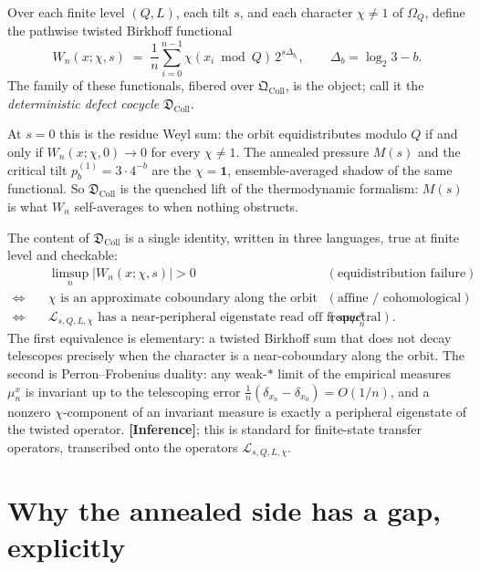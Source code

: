 \documentclass[11pt]{article}
\newcommand{\Lcal}{\mathcal{L}}
\newcommand{\Om}{\Omega}
\newcommand{\Qcoll}{\mathfrak{Q}_{\mathrm{Coll}}}
\newcommand{\Dcoll}{\mathfrak{D}_{\mathrm{Coll}}}
\newcommand{\epi}[1]{{\small\sffamily\textbf{[#1]}}}
\theoremstyle{remark}
\begin{document}
Over each finite level $(Q,L)$, each tilt $s$, and each character $\chi\ne 1$ of $\Om_Q$,
define the pathwise twisted Birkhoff functional
\[
W_n(x;\chi,s) \;=\; \frac1n \sum_{i=0}^{n-1} \chi(x_i \bmod Q)\, 2^{s\Delta_{b_i}},
\qquad \Delta_b = \log_2 3 - b.
\]
The family of these functionals, fibered over $\Qcoll$, is the object; call it the
\emph{deterministic defect cocycle} $\Dcoll$.

At $s=0$ this is the residue Weyl sum: the orbit equidistributes modulo $Q$ if and only if
$W_n(x;\chi,0)\to 0$ for every $\chi\ne 1$. The annealed pressure $M(s)$ and the critical
tilt $p^{(1)}_b = 3\cdot 4^{-b}$ are the $\chi=\mathbf 1$, ensemble-averaged shadow of the
same functional. So $\Dcoll$ is the quenched lift of the thermodynamic formalism: $M(s)$ is
what $W_n$ self-averages to when nothing obstructs.

The content of $\Dcoll$ is a single identity, written in three languages, true at finite
level and checkable:
\[
\begin{aligned}
        &\limsup_n \lvert W_n(x;\chi,s)\rvert > 0
        &&(\text{equidistribution failure})\\[2pt]
\Longleftrightarrow\quad
        &\chi \text{ is an approximate coboundary along the orbit}
        &&(\text{affine / cohomological})\\[2pt]
\Longleftrightarrow\quad
        &\Lcal_{s,Q,L,\chi} \text{ has a near-peripheral eigenstate read off from } \mu_n^x
        &&(\text{spectral}).
\end{aligned}
\]
The first equivalence is elementary: a twisted Birkhoff sum that does not decay telescopes
precisely when the character is a near-coboundary along the orbit. The second is
Perron--Frobenius duality: any weak-$\ast$ limit of the empirical measures $\mu_n^x$ is
invariant up to the telescoping error $\tfrac1n(\delta_{x_n} - \delta_{x_0}) = O(1/n)$, and
a nonzero $\chi$-component of an invariant measure is exactly a peripheral eigenstate of the
twisted operator. \epi{Inference}; this is standard for finite-state transfer operators,
transcribed onto the operators $\Lcal_{s,Q,L,\chi}$.

\section{Why the annealed side has a gap, explicitly}
\end{document}
